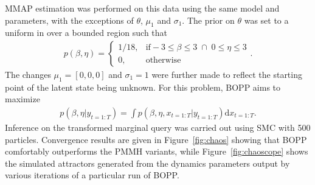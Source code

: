 MMAP estimation was performed on this data using the same model and parameters, with the exceptions of $\theta$, $\mu_1$ and $\sigma_1$.  
The prior on $\theta$ was set to a uniform in over a bounded region such that
\begin{align}
\label{eq:priorKalman}
p\left(\beta,\eta\right) = \begin{cases}
1/18, & \mathrm{if} -3 \le \beta \le 3 \; \cap \; 0 \le \eta \le 3\\
0, & \mathrm{otherwise}
\end{cases}.
\end{align}
The changes $\mu_1 = [0,0,0]$ and $\sigma_1 = 1$ were further made to reflect the starting point of the latent state being unknown.   For this problem, BOPP aims to maximize
\begin{align}
p(\beta,\eta | y_{t=1:T}) = \int p(\beta,\eta,x_{t=1:T} | y_{t=1:T}) \mathrm{d}x_{t=1:T} .
\end{align}
Inference on the transformed marginal query was carried out using SMC with 500 particles.  Convergence results are given in Figure~\ref{fig:chaos} showing that BOPP comfortably outperforms the PMMH variants, while Figure~\ref{fig:chaoscope} shows the simulated attractors generated from the dynamics parameters output by various iterations of a particular run of BOPP.
